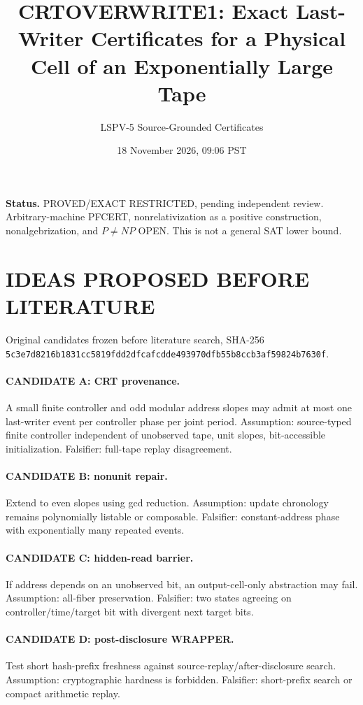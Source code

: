\documentclass[11pt]{article}
\title{CRTOVERWRITE1: Exact Last-Writer Certificates for a Physical Cell of an Exponentially Large Tape}
\author{LSPV-5 Source-Grounded Certificates}
\date{18 November 2026, 09:06 PST}
\begin{document}
\maketitle
\noindent\textbf{Status.} PROVED/EXACT RESTRICTED, pending independent review. Arbitrary-machine PFCERT, nonrelativization as a positive construction, nonalgebrization, and $P\ne NP$ OPEN. This is not a general SAT lower bound.

\section{IDEAS PROPOSED BEFORE LITERATURE}
Original candidates frozen before literature search, SHA-256 \texttt{5c3e7d8216b1831cc5819fdd2dfcafcdde493970dfb55b8ccb3af59824b7630f}.
\paragraph{CANDIDATE A: CRT provenance.} A small finite controller and odd modular address slopes may admit at most one last-writer event per controller phase per joint period. Assumption: source-typed finite controller independent of unobserved tape, unit slopes, bit-accessible initialization. Falsifier: full-tape replay disagreement.
\paragraph{CANDIDATE B: nonunit repair.} Extend to even slopes using gcd reduction. Assumption: update chronology remains polynomially listable or composable. Falsifier: constant-address phase with exponentially many repeated events.
\paragraph{CANDIDATE C: hidden-read barrier.} If address depends on an unobserved bit, an output-cell-only abstraction may fail. Assumption: all-fiber preservation. Falsifier: two states agreeing on controller/time/target bit with divergent next target bits.
\paragraph{CANDIDATE D: post-disclosure WRAPPER.} Test short hash-prefix freshness against source-replay/after-disclosure search. Assumption: cryptographic hardness is forbidden. Falsifier: short-prefix search or compact arithmetic replay.
\end{document}
